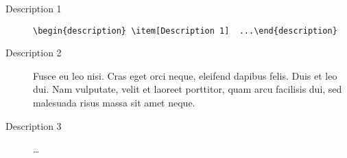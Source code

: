 \documentclass[a4paper,UKenglish,cleveref, autoref]{lipics-v2019}
\begin{document}
\begin{description}
\item[Description 1] \verb|\begin{description} \item[Description 1]  ...\end{description}|
\item[Description 2] Fusce eu leo nisi. Cras eget orci neque, eleifend dapibus felis. Duis et leo dui. Nam vulputate, velit et laoreet porttitor, quam arcu facilisis dui, sed malesuada risus massa sit amet neque.
\item[Description 3]  \dots
\end{description}
\end{document}
